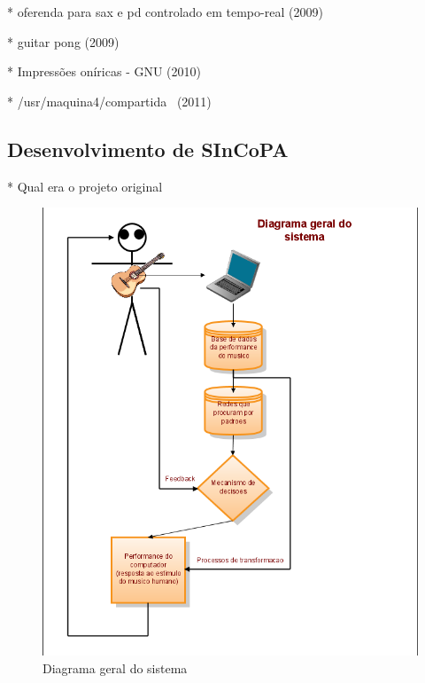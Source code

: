 \documentclass{ppgmus}
\begin{document}
* oferenda para sax e pd controlado em tempo-real (2009)

* guitar pong (2009)

* Impressões oníricas - GNU (2010)

* /usr/maquina4/compartida~ (2011)

\subsection{Desenvolvimento de SInCoPA}



* Qual era o projeto original


\begin{figure}
\includegraphics[scale=.7]{geral}
\caption{Diagrama geral do sistema}
\label{geral}
\end{figure}
\end{document}
